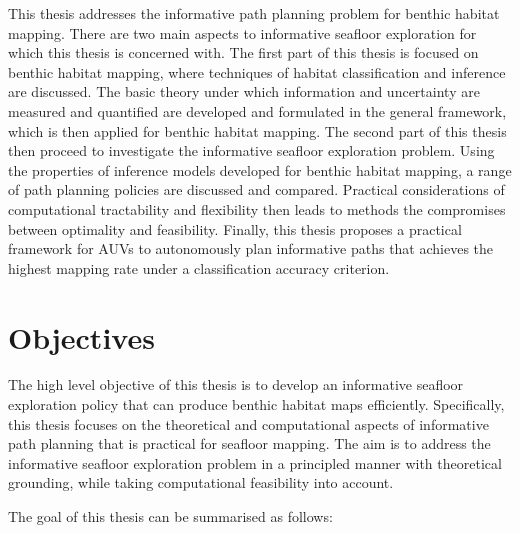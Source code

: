 		This thesis addresses the informative path planning problem for benthic habitat mapping. There are two main aspects to informative seafloor exploration for which this thesis is concerned with. The first part of this thesis is focused on benthic habitat mapping, where techniques of habitat classification and inference are discussed. The basic theory under which information and uncertainty are measured and quantified are developed and formulated in the general framework, which is then applied for benthic habitat mapping. The second part of this thesis then proceed to investigate the informative seafloor exploration problem. Using the properties of inference models developed for benthic habitat mapping, a range of path planning policies are discussed and compared. Practical considerations of computational tractability and flexibility then leads to methods the compromises between optimality and feasibility. Finally, this thesis proposes a practical framework for AUVs to autonomously plan informative paths that achieves the highest mapping rate under a classification accuracy criterion.
		
\section{Objectives}

	The high level objective of this thesis is to develop an informative seafloor exploration policy that can produce benthic habitat maps efficiently. Specifically, this thesis focuses on the theoretical and computational aspects of informative path planning that is practical for seafloor mapping. The aim is to address the informative seafloor exploration problem in a principled manner with theoretical grounding, while taking computational feasibility into account. 
	
	The goal of this thesis can be summarised as follows:
	
